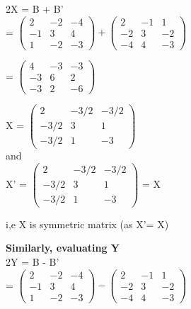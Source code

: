 \documentclass[a4paper,12pt]{article}
\begin{document}
2X = B + B'\\

 \hspace*{0.5cm}=  $\begin{pmatrix}2 & -2 & -4 \\-1 & 3 & 4 \\1 & -2 & -3\end{pmatrix} + \begin{pmatrix}2 & -1 & 1 \\-2 & 3 & -2 \\-4& 4& -3\end{pmatrix}$\\

\hspace*{1cm}

\hspace*{0.5cm}= $\begin{pmatrix}4 & -3 & -3 \\-3 & 6 & 2 \\-3 & 2 & -6\end{pmatrix}$\\

\hspace*{1cm}

 X = $\begin{pmatrix}2 & -3/2 & -3/2 \\-3/2 & 3 & 1 \\-3/2 & 1 & -3\end{pmatrix}$\\

and\\

 X' = $\begin{pmatrix}2 & -3/2 & -3/2 \\-3/2 & 3 & 1 \\-3/2 & 1 & -3\end{pmatrix}$ = X
 
\vspace*{1cm}
 
i,e X is symmetric matrix \hspace*{3cm}(as X'= X)\\

\hspace*{0.5cm}

\textbf{Similarly, evaluating Y}\\

2Y = B - B'\\

\hspace*{0.5cm}=  $\begin{pmatrix}2 & -2 & -4 \\-1 & 3 & 4 \\1 & -2 & -3\end{pmatrix} - \begin{pmatrix}2 & -1 & 1 \\-2 & 3 & -2 \\-4& 4& -3\end{pmatrix}$\\
\end{document}
